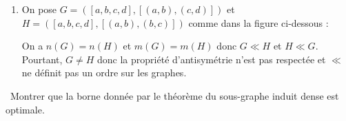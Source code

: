 \begin{td-sol}[]
\begin{enumerate}
\begin{enumerate}
            Ainsi, comme \(V(G) = V(H)\) et \(E(G) = E(H)\), on a bien \(G = H\).

            \item Transitivit\'e : soient \(G, H\) et \(I\) trois graphes tels que \(G\) est sous-graphe de \(H\) et \(H\) est sous-graphe de \(I\).
            Alors, on a :
            \begin{equation*}
                \begin{aligned}
                    \hphantom{\implies} & V(G) \subseteq V(H) \quad \text{ et } V(H) \subseteq V(I) \\
                    \implies & V(G) \subseteq V(H) \subseteq V(I) \\
                    \implies & V(G) \subseteq V(I).
                \end{aligned}
            \end{equation*}

            De m\^eme, on a :
            
            \begin{equation*}
                \begin{aligned}
                    \hphantom{\implies} & E(G) \subseteq E(H) \quad \text{ et } E(H) \subseteq E(I) \\
                    \implies & E(G) \subseteq E(H) \subseteq E(I) \\
                    \implies & E(G) \subseteq E(I).
                \end{aligned}
            \end{equation*}

            Ainsi, comme \(V(G) \subseteq V(I)\) et \(E(G) \subseteq E(I)\), on a bien \(G\) sous-graphe de \(I\).
        \end{enumerate}

        \item On pose \(G = ([a, b, c, d], [(a, b), (c, d)])\) et \(H = ([a, b, c, d], [(a, b), (b, c)])\) comme dans la figure ci-dessous :
        
        

        On a \(n(G) = n(H)\) et \(m(G) = m(H)\) donc \(G \ll H\) et \(H \ll G\).
        Pourtant, \(G \neq H\) donc la propri\'et\'e d'antisym\'etrie n'est pas respect\'ee et \(\ll\) ne d\'efinit pas un ordre sur les graphes.
    \end{enumerate}
\end{td-sol}

\begin{td-exo}\, %
    Montrer que la borne donn\'ee par le th\'eor\`eme du sous-graphe induit dense est optimale.
\end{td-exo}

